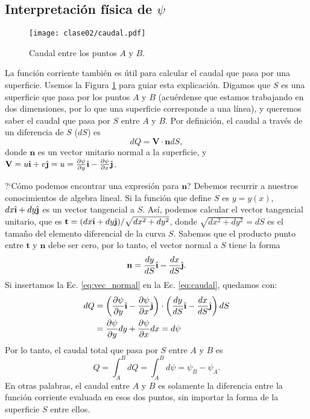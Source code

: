 \subsection*{Interpretación física de $\psi$}

\begin{figure}[!h]
\centering
\texttt{[image: clase02/caudal.pdf]}
\caption{Caudal entre los puntos $A$ y $B$.}
\label{fig:caudal}
\end{figure}

La función corriente también es útil para calcular el caudal que pasa por una superficie.
Usemos la Figura \ref{fig:caudal} para guiar esta explicación.
Digamos que $S$ es una superficie que pasa por los puntos $A$ y $B$ (acuérdense que estamos trabajando en dos dimensiones, por lo que una superficie corresponde a una línea), y queremos saber el caudal que pasa por $S$ entre $A$ y $B$.
Por definición, el caudal a través de un diferencia de $S$ ($dS$) es 
%
\begin{equation}\label{eq:caudal}
dQ = \mathbf{V}\cdot\mathbf{n}dS,
\end{equation}
%
donde $\mathbf{n}$ es un vector unitario normal a la superficie, y $\mathbf{V}=u\ihat+v\jhat=u = \frac{\partial \psi}{\partial y} \ihat -\frac{\partial \psi}{\partial x}\jhat$.

\mbox{?`}Cómo podemos encontrar una expresión para $\mathbf{n}$? Debemos recurrir a nuestros conocimientos de algebra lineal.
Si la función que define $S$ es $y=y(x)$, $dx\ihat+dy\jhat$ es un vector tangencial a $S$.
Así, podemos calcular el vector tangencial unitario, que es $\mathbf{t}=(dx\ihat+dy\jhat)/\sqrt{dx^2+dy^2}$, donde $\sqrt{dx^2+dy^2}=dS$ es el tamaño del elemento diferencial de la curva $S$.
Sabemos que el producto punto entre $\mathbf{t}$ y $\mathbf{n}$ debe ser cero, por lo tanto, el vector normal a $S$ tiene la forma
%
\begin{equation}\label{eq:vec_normal}
\mathbf{n} = \frac{dy}{dS}\ihat - \frac{dx}{dS}\jhat.
\end{equation}
%
Si insertamos la Ec. \eqref{eq:vec_normal} en la Ec. \eqref{eq:caudal}, quedamos con:
%
\begin{align}
dQ &= \left(\frac{\partial \psi}{\partial y} \ihat -\frac{\partial \psi}{\partial x}\jhat\right)\cdot\left( \frac{dy}{dS}\ihat - \frac{dx}{dS}\jhat\right)dS\nonumber\\
   &= \frac{\partial \psi}{\partial y}dy +\frac{\partial \psi}{\partial x}dx = d\psi
\end{align}
%
Por lo tanto, el caudal total que pasa por $S$ entre $A$ y $B$ es
\begin{equation}
Q=\int_A^BdQ = \int_A^Bd\psi = \psi_B-\psi_A.
\end{equation}
%
En otras palabras, el caudal entre $A$ y $B$ es solamente la diferencia entre la función corriente evaluada en esos dos puntos, sin importar la forma de la superficie $S$ entre ellos.
